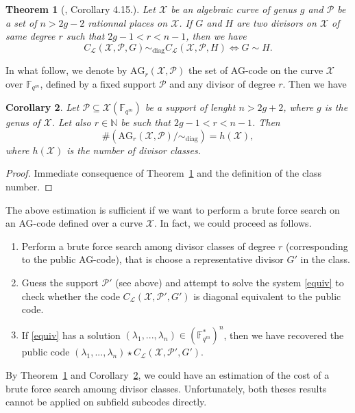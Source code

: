 \documentclass[10pt]{article}
\newtheorem{thm}{Theorem}
\newtheorem{coro1}[thm]{Corollary}
\theoremstyle{definition}
\theoremstyle{definition}
\theoremstyle{definition}
\newcommand{\s}{\vspace{0.3cm}}
\newcommand{\N}{\mathbb{N}}
\newcommand{\fqm}{\mathbb{F}_{q^m}}
\newcommand{\su}{\subseteq}
\newcommand{\X}{\mathcal{X}}
\newcommand{\PR}{\mathcal{P}}
\newcommand{\calL}{\mathcal{L}}
\begin{document}
\s

\begin{thm} [\cite{CMRP}, Corollary 4.15.]  \label{thmequiv}
Let $\X$ be an algebraic curve of genus $g$ and $\PR$ be a set of $n>2g-2$ rationnal places on $\X$. If $G$ and $H$ are two divisors on $\X$ of same degree $r$ such that $2g-1 < r < n-1$, then we have 
\[C_{\calL}(\X,\PR,G) \sim_{\mathrm{diag}} C_{\calL}(\X,\PR,H) \iff G \sim H.\]
\end{thm}

\s

In what follow, we denote by $\mathrm{AG}_r(\X,\PR)$ the set of AG-code on the curve $\X$ over $\fqm$, defined by a fixed support $\PR$ and any divisor of degree $r$. Then we have 

\s

\begin{coro1} \label{nbAGr}
Let $\PR \su \X(\fqm)$ be a support of lenght $n > 2g+2$, where $g$ is the genus of $\X$. Let also $r \in \N$ be such that $2g-1 < r < n-1$. Then 
\[ \#\left(\mathrm{AG}_r(\X,\PR)/ \sim_{\mathrm{diag}}\right)= h(\X),\]
where $h(\X)$ is the number of divisor classes.
\end{coro1}

\s

\begin{proof}
Immediate consequence of Theorem~\ref{thmequiv} and the definition of the class number.
\end{proof}

\s

The above estimation is sufficient if we want to perform a brute force search on an AG-code defined over a curve $\X$. In fact, we could proceed as follows.
\begin{enumerate}
\item Perform a brute force search among divisor classes of degree $r$ (corresponding to the public AG-code), that is choose a representative divisor $G'$ in the class.
\item Guess the support $\PR'$ (see above) and attempt to solve the system \eqref{equiv} to check whether the code $C_{\calL}(\X,\PR',G')$ is diagonal equivalent to the public code.
\item If \eqref{equiv} has a solution $(\lambda_1,...,\lambda_n) \in (\fqm^*)^n$, then we have recovered the public code $(\lambda_1,...,\lambda_n) \star C_{\calL}(\X,\PR',G')$.
\end{enumerate}

By Theorem~\ref{thmequiv} and Corollary~\ref{nbAGr}, we could have an estimation of the cost of a brute force search amoung divisor classes. Unfortunately, both theses results cannot be applied on subfield subcodes directly.
\end{document}
